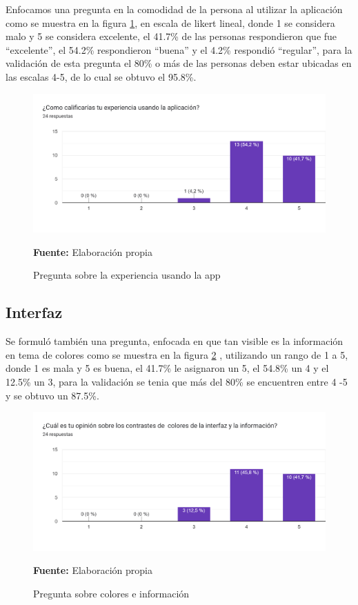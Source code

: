 \documentclass[12pt,twocolumn,a4paper]{article}
\begin{document}
Enfocamos una pregunta en la comodidad de la persona al utilizar la aplicación como se muestra en la figura \ref{Encuesta3},  en escala de likert lineal, donde 1 se considera malo y 5 se considera excelente, el 41.7\% de las personas respondieron que fue “excelente”, el 54.2\% respondieron “buena” y el 4.2\% respondió “regular”,  para la validación de esta pregunta el 80\% o más de las personas deben estar ubicadas en las escalas 4-5, de lo cual se obtuvo el 95.8\%.

\begin{figure}
	\centering
	\includegraphics[scale=0.3]{Encuesta3.png}
	\caption{Pregunta sobre la experiencia usando la app} \textbf{Fuente:} Elaboración propia 
	\label{Encuesta3}
\end{figure}

\subsection{Interfaz}

Se formuló también una pregunta, enfocada en que tan visible es la información en tema de colores como se muestra en la figura \ref{Encuesta4} , utilizando un rango de 1 a 5, donde 1 es mala y 5 es buena, el 41.7\% le asignaron un 5, el 54.8\% un 4 y el 12.5\% un 3, para la validación se tenia que más del 80\% se encuentren entre 4 -5 y se obtuvo un 87.5\%.

\begin{figure}
	\centering
	\includegraphics[scale=0.3]{Encuesta4.png}
	\caption{Pregunta sobre colores e información} \textbf{Fuente:} Elaboración propia 
	\label{Encuesta4}
\end{figure}
\end{document}
